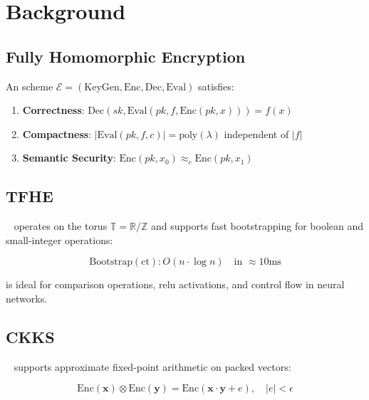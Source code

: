 \section{Background}


\subsection{Fully Homomorphic Encryption}

\begin{definition}
An \FHE{} scheme $\mathcal{E} = (\text{KeyGen}, \text{Enc}, \text{Dec}, \text{Eval})$ satisfies:
\begin{enumerate}
    \item \textbf{Correctness}: $\text{Dec}(sk, \text{Eval}(pk, f, \text{Enc}(pk, x))) = f(x)$
    \item \textbf{Compactness}: $|\text{Eval}(pk, f, c)| = \text{poly}(\lambda)$ independent of $|f|$
    \item \textbf{Semantic Security}: $\text{Enc}(pk, x_0) \approx_c \text{Enc}(pk, x_1)$
\end{enumerate}
\end{definition}

\subsection{TFHE}

\TFHE{}~\cite{chillotti2020tfhe} operates on the torus $\mathbb{T} = \mathbb{R}/\mathbb{Z}$ and supports fast bootstrapping for boolean and small-integer operations:

\begin{equation}
\text{Bootstrap}(\text{ct}) : O(n \cdot \log n) \quad \text{in } \approx 10\text{ms}
\end{equation}

\TFHE{} is ideal for comparison operations, relu activations, and control flow in neural networks.

\subsection{CKKS}

\CKKS{}~\cite{cheon2017ckks} supports approximate fixed-point arithmetic on packed vectors:

\begin{equation}
\text{Enc}(\mathbf{x}) \otimes \text{Enc}(\mathbf{y}) = \text{Enc}(\mathbf{x} \cdot \mathbf{y} + e), \quad |e| < \epsilon
\end{equation}


